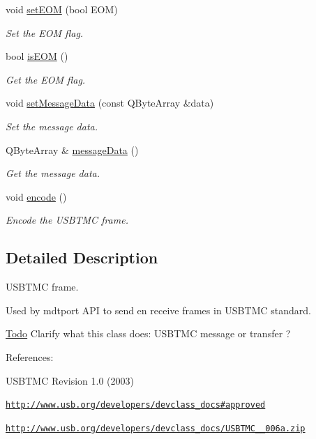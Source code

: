 \begin{DoxyCompactItemize}
void \hyperlink{classmdt_frame_usb_tmc_ab6e494c35eba34905987a75101fc48fe}{setEOM} (bool EOM)
\begin{DoxyCompactList}\small\item\em Set the EOM flag. \end{DoxyCompactList}\item 
bool \hyperlink{classmdt_frame_usb_tmc_a7e989c5334db2a2f5e21a4892cf3460c}{isEOM} ()
\begin{DoxyCompactList}\small\item\em Get the EOM flag. \end{DoxyCompactList}\item 
void \hyperlink{classmdt_frame_usb_tmc_a7fa61faeaa5d1f5820794c5943b26e26}{setMessageData} (const QByteArray \&data)
\begin{DoxyCompactList}\small\item\em Set the message data. \end{DoxyCompactList}\item 
QByteArray \& \hyperlink{classmdt_frame_usb_tmc_a03d9a1c16099ba7ea1e3a2b0c4e1493e}{messageData} ()
\begin{DoxyCompactList}\small\item\em Get the message data. \end{DoxyCompactList}\item 
void \hyperlink{classmdt_frame_usb_tmc_a9406dddfdd70f5dac729b2dbd728de77}{encode} ()
\begin{DoxyCompactList}\small\item\em Encode the USBTMC frame. \end{DoxyCompactList}\end{DoxyCompactItemize}


\subsection{Detailed Description}
USBTMC frame. 

Used by mdtport API to send en receive frames in USBTMC standard.

\begin{Desc}
\item[\hyperlink{todo__todo000037}{Todo}]Clarify what this class does: USBTMC message or transfer ?\end{Desc}


References:
\begin{DoxyItemize}
\item USBTMC Revision 1.0 (2003)
\item \href{http://www.usb.org/developers/devclass_docs#approved}{\tt http://www.usb.org/developers/devclass\_\-docs\#approved}
\item \href{http://www.usb.org/developers/devclass_docs/USBTMC_1_006a.zip}{\tt http://www.usb.org/developers/devclass\_\-docs/USBTMC\_\_\-006a.zip} 
\end{DoxyItemize}

